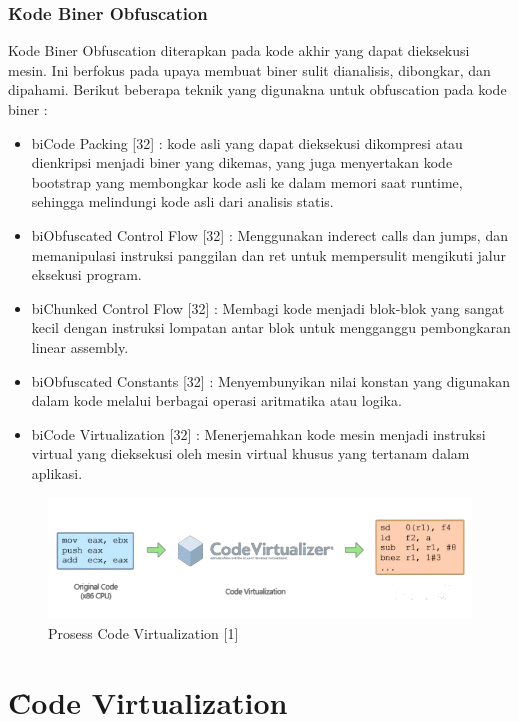 \subsubsection{\f{Kode Biner Obfuscation}}
Kode Biner Obfuscation diterapkan pada kode akhir yang dapat dieksekusi mesin. Ini berfokus pada upaya membuat biner sulit dianalisis, dibongkar, dan dipahami. Berikut beberapa teknik yang digunakna untuk obfuscation pada kode biner :
\begin{itemize}
	\item bi{Code Packing [32] :} kode asli yang dapat dieksekusi dikompresi atau dienkripsi menjadi biner yang dikemas, yang juga menyertakan kode bootstrap yang membongkar kode asli ke dalam memori saat runtime, sehingga melindungi kode asli dari analisis statis.
	\item bi{Obfuscated Control Flow [32] :} Menggunakan inderect calls dan  jumps, dan memanipulasi instruksi panggilan dan ret untuk mempersulit mengikuti jalur eksekusi program.
	\item bi{Chunked Control Flow [32] :} Membagi kode menjadi blok-blok yang sangat kecil dengan instruksi lompatan antar blok untuk mengganggu pembongkaran linear assembly.
	\item bi{Obfuscated Constants [32] :} Menyembunyikan nilai konstan yang digunakan dalam kode melalui berbagai operasi aritmatika atau logika.
	\item bi{Code Virtualization [32] :} Menerjemahkan kode mesin menjadi instruksi virtual yang dieksekusi oleh mesin virtual khusus yang tertanam dalam aplikasi.
\end{itemize}

\begin{figure}
	\centering
	\includegraphics[width=.8\textwidth]
	{assets/pics/code_virtualization_process.png}
	\caption{Prosess Code Virtualization [1]}
\end{figure}
\section{\f{Code Virtualization}}

